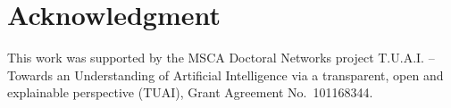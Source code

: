 \documentclass[conference]{IEEEtran}
\begin{document}
\section*{Acknowledgment}

This work was supported by the MSCA Doctoral Networks project T.U.A.I. -- Towards an Understanding of Artificial Intelligence via a transparent, open and explainable perspective (TUAI), Grant Agreement No.~101168344.



\end{document}
